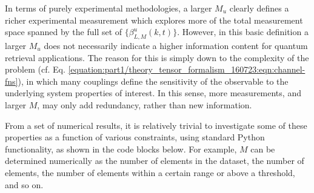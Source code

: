 \documentclass[letterpaper,table,10pt,english]{jupyterBook}
\begin{document}
\sphinxAtStartPar
In terms of purely experimental methodologies, a larger \(M_{u}\) clearly
defines a richer experimental measurement which explores more of the
total measurement space spanned by the full set of
\(\{\beta_{L,M}^{u}(k,t)\}\). However, in this basic definition a larger
\(M_{u}\) does not necessarily indicate a higher information content for
quantum retrieval applications. The reason for this is simply down to
the complexity of the problem (cf. Eq. \eqref{equation:part1/theory_tensor_formalism_160723:eqn:channel-fns}), in which many couplings define the sensitivity of the observable to the underlying system properties of
interest. In this sense, more measurements, and larger \(M\), may only add
redundancy, rather than new information.

\sphinxAtStartPar
From a set of numerical results, it is relatively trivial to investigate some of these properties as a function of various constraints, using standard Python functionality, as shown in the code blocks below. For example, \(M\) can be determined numerically as the number of elements in the dataset, the number of  elements, the number of elements within a certain range or above a threshold, and so on.
\end{document}
